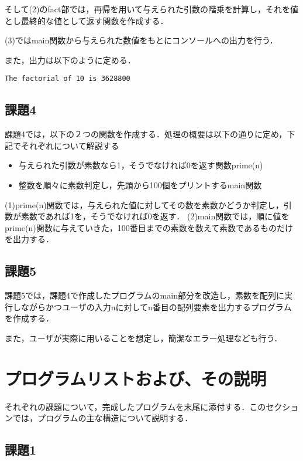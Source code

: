 \documentclass[a4j]{jarticle}
\begin{document}
そして(2)のfact部では，再帰を用いて与えられた引数の階乗を計算し，それを値とし最終的な値として返す関数を作成する．

(3)ではmain関数から与えられた数値をもとにコンソールへの出力を行う． 

また，出力は以下のように定める．

{\baselineskip 3mm
\begin{verbatim}
The factorial of 10 is 3628800
\end{verbatim}
}


\subsection{課題4}

課題4では，以下の２つの関数を作成する．処理の概要は以下の通りに定め，下記でそれぞれについて解説する

\begin{itemize}
\item[(1)]与えられた引数が素数なら1，そうでなければ0を返す関数prime(n)
\item[(2)]整数を順々に素数判定し，先頭から100個をプリントするmain関数
\end{itemize}


(1)prime(n)関数では，与えられた値に対してその数を素数かどうか判定し，引数が素数であれば1を，そうでなければ0を返す．
(2)main関数では，順に値をprime(n)関数に与えていきた，100番目までの素数を数えて素数であるものだけを出力する．

\subsection{課題5}

課題5では，課題4で作成したプログラムのmain部分を改造し，素数を配列に実行しながらかつユーザの入力nに対してn番目の配列要素を出力するプログラムを作成する．

また，ユーザが実際に用いることを想定し，簡潔なエラー処理なども行う．




%
%

\section{プログラムリストおよび、その説明}

それぞれの課題について，完成したプログラムを末尾に添付する．このセクションでは，プログラムの主な構造について説明する．

\subsection{課題1}
\end{document}

